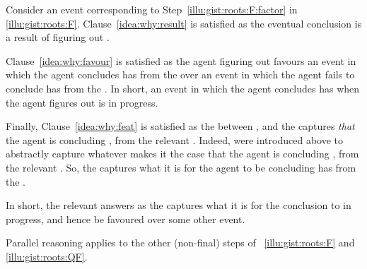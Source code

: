\begin{note}
  Consider an event corresponding to Step~\ref{illu:gist:roots:F:factor} in \autoref{illu:gist:roots:F}.
  Clause~\ref{idea:why:result} is satisfied as the eventual conclusion is a result of figuring out \rootsConEqFac{}.

  Clause~\ref{idea:why:favour} is satisfied as the agent figuring out \rootsConEqFac{} favours an event in which the agent concludes \propI{\rootsCon{}} has   from the \pool{} over an event in which the agent fails to conclude \propI{\rootsCon{}} has   from the \pool{}.
  In short, an event in which the agent concludes \propI{\rootsCon{}} has   when the agent figures out \rootsConEqFac{} is in progress.

  Finally, Clause~\ref{idea:why:feat} is satisfied as the \ros{} between \propI{\rootsCon{}},  and the \pool{} captures \emph{that} the agent is concluding \propM{\rootsCon{}},  from the relevant \pool{}.
  Indeed,  were introduced above to abstractly capture whatever makes it the case that the agent is concluding \propM{\rootsCon{}},  from the relevant \pool{}.
  So, the \ros{} captures what it is for the agent to be concluding \propI{\rootsCon{}} has   from the \pool{}.
\end{note}


\begin{note}
  In short, the relevant  answers \qWhy{} as the \ros{} captures what it is for the conclusion to in progress, and hence be favoured over some other event.

  Parallel reasoning applies to the other (non-final) steps of ~\ref{illu:gist:roots:F} and \ref{illu:gist:roots:QF}.
\end{note}


